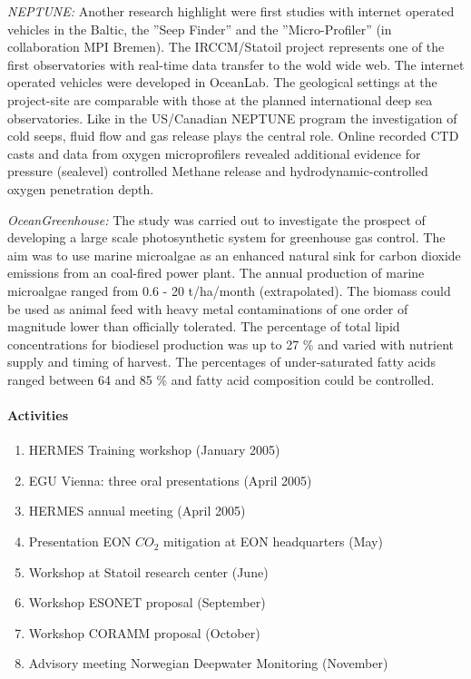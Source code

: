 {\it NEPTUNE:} Another research highlight were first studies
with internet operated vehicles in the Baltic, the ''Seep Finder''
and the ''Micro-Profiler'' (in collaboration MPI Bremen). The
IRCCM/Statoil project represents one of the first observatories
with real-time data transfer to the wold wide web. The internet
operated vehicles were developed in OceanLab. The geological
settings at the project-site are comparable with those at the
planned international deep sea observatories. Like in the
US/Canadian NEPTUNE program the investigation of cold seeps, fluid
flow and gas release plays the central role. Online recorded CTD
casts and data from oxygen microprofilers revealed additional
evidence for pressure (sealevel) controlled Methane release and
hydrodynamic-controlled oxygen penetration depth.

{\it OceanGreenhouse:} The study was carried out to
investigate the prospect of developing a large scale
photosynthetic system for greenhouse gas control. The aim was to
use marine microalgae as an enhanced natural sink for carbon
dioxide emissions from an coal-fired power plant. The annual
production of marine microalgae ranged from 0.6 - 20 t/ha/month
(extrapolated). The biomass could be used as animal feed with
heavy metal contaminations of one order of magnitude lower than
officially tolerated. The percentage of total lipid concentrations
for biodiesel production was up to 27 \% and varied  with nutrient
supply and timing of harvest. The percentages of under-saturated
fatty acids ranged between 64 and 85 \% and fatty acid composition
could be controlled.

\paragraph{Activities}

\begin{enumerate}
\item HERMES Training workshop (January 2005) \item  EGU Vienna:
three oral presentations (April 2005) \item  HERMES annual meeting
(April 2005) \item  Presentation EON $CO_2$ mitigation at EON
headquarters (May) \item  Workshop at Statoil research center
(June) \item Workshop ESONET proposal (September) \item  Workshop
CORAMM proposal (October) \item  Advisory meeting Norwegian
Deepwater Monitoring (November)
\end{enumerate}

